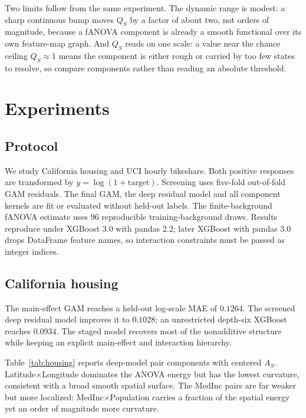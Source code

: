 \documentclass[11pt]{article}
\begin{document}
Two limits follow from the same experiment. The dynamic range is modest: a sharp
continuous bump moves $Q_S$ by a factor of about two, not orders of magnitude,
because a fANOVA component is already a smooth functional over its own feature-map
graph. And $Q_S$ reads on one scale: a value near the chance ceiling $Q_S\approx1$
means the component is either rough or carried by too few states to
resolve, so compare components rather than reading an absolute threshold.

\section{Experiments}

\subsection{Protocol}

We study California housing and UCI hourly bikeshare. Both positive responses are
transformed by $y=\log(1+\text{target})$. Screening uses five-fold out-of-fold
GAM residuals. The final GAM, the deep residual model and all component kernels
are fit or evaluated without held-out labels. The finite-background fANOVA
estimate uses $96$ reproducible training-background draws. Results reproduce under
XGBoost 3.0 with pandas 2.2; later XGBoost with pandas 3.0 drops DataFrame
feature names, so interaction constraints must be passed as integer indices.

\subsection{California housing}

The main-effect GAM reaches a held-out log-scale MAE of $0.1264$. The screened
deep residual model improves it to $0.1028$; an unrestricted depth-six XGBoost
reaches $0.0934$. The staged model recovers most of the nonadditive structure
while keeping an explicit main-effect and interaction hierarchy.

Table~\ref{tab:housing} reports deep-model pair components with centered $A_S$.
Latitude$\times$Longitude dominates the ANOVA energy but has the lowest
curvature, consistent with a broad smooth spatial surface. The MedInc pairs are
far weaker but more localized: MedInc$\times$Population carries a fraction of the
spatial energy yet an order of magnitude more curvature.
\end{document}
